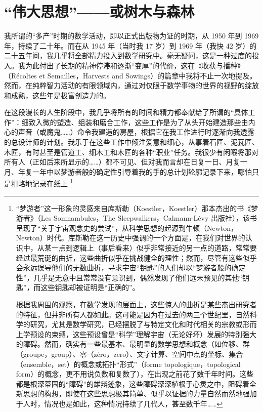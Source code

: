 \section{“伟大思想”——或树木与森林}

我所谓的“多产”时期的数学活动，即以正式出版物为证的时期，从 1950 年到 1969 年，持续了二十年。而在从 1945 年（当时我 17 岁）到 1969 年（我快 42 岁）的二十五年间，我几乎将全部精力投入到数学研究中。毫无疑问，这是一种过度的投入。我为此付出了长期的精神停滞和逐渐“变厚”的代价，这在《收获与播种》（Récoltes et Semailles，Harvests and Sowings）的篇章中我将不止一次地提及。然而，在纯粹智力活动的有限领域内，通过对仅限于数学事物的世界的视野的绽放和成熟，这些年是极富创造力的。

在这段漫长的人生阶段中，我几乎将所有的时间和精力都奉献给了所谓的“具体工作”：细致入微的塑造、组装和磨合工作，这些工作是为了从头开始建造那些由内心的声音（或魔鬼……）命令我建造的房屋，根据它在我工作进行时逐渐向我透露的总设计师的计划。我乐于在这些工作中倾注爱意和细心，从事着石匠、泥瓦匠、木匠，有时甚至是管道工、细木工和木匠的各种“职业”任务。我很少有闲暇将那对所有人（正如后来所显示的……）都不可见、但对我而言却在日复一日、月复一月、年复一年中以梦游者般的确定性引导着我的手的总计划轮廓记录下来，哪怕只是粗略地记录在纸上 \footnote{“梦游者”这一形象的灵感来自库斯勒（Koestler，Koestler）那本杰出的书《梦游者》（Les Somnambules，The Sleepwalkers，Calmann-Lévy 出版社），该书呈现了“关于宇宙观念史的尝试”，从科学思想的起源到牛顿（Newton，Newton）时代。库斯勒在这一历史中强调的一个方面是，在我们对世界的认识中，从某一点到逻辑上（事后看来）似乎非常接近的另一点的道路，常常要经过最荒诞的曲折，这些曲折似乎在挑战健全的理性；然而，尽管有这些似乎会永远误导他们的无数曲折，寻求宇宙“钥匙”的人们却以“梦游者般的确定性”，几乎是无意中且常常没有意识到，偶然发现了他们远未预见的其他“钥匙”，而这些钥匙却被证明是“正确的”。

根据我周围的观察，在数学发现的层面上，这些惊人的曲折是某些杰出研究者的特征，但并非所有人都如此。这可能是因为在过去的两三个世纪里，自然科学的研究，尤其是数学研究，已经摆脱了与特定文化和时代相关的宗教或形而上学预设的束缚，这些预设曾是“科学”理解宇宙（无论好坏）发展的特别强大的障碍。然而，确实有一些最基本、最明显的数学思想和概念（如位移、群（groupe，group）、零（zéro，zero）、文字计算、空间中点的坐标、集合（ensemble，set）的概念或拓扑“形式”（forme topologique，topological form）的概念，更不用说负数和复数了），在出现之前花了数千年时间。这些都是根深蒂固的“障碍”的雄辩迹象，这些障碍深深植根于心灵之中，阻碍着全新思想的构想，即使在这些思想极其简单、似乎以证据的力量自然而然地强加于人时，情况也是如此，这种情况持续了几代人，甚至数千年……

}
